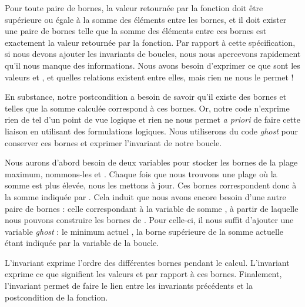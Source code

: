 


Pour toute paire de bornes, la valeur retournée par la fonction doit être
supérieure ou égale à la somme des éléments entre les bornes, et il doit exister
une paire de bornes telle que la somme des éléments entre ces bornes est
exactement la valeur retournée par la fonction. Par rapport à cette spécification,
si nous devons ajouter les invariants de boucles, nous nous apercevons rapidement
qu'il nous manque des informations. Nous avons besoin d'exprimer ce que sont
les valeurs  et , et quelles relations existent
entre elles, mais rien ne nous le permet !



En substance, notre postcondition a besoin de savoir qu'il existe des
bornes  et  telles que la somme calculée correspond à ces bornes.
Or, notre code n'exprime rien de tel d'un point de vue logique et rien ne nous
permet \textit{a priori} de faire cette liaison en utilisant des formulations logiques.
Nous utiliserons du code \textit{ghost} pour conserver ces bornes et exprimer
l'invariant de notre boucle.



Nous aurons d'abord besoin de deux variables pour stocker
les bornes de la plage maximum, nommons-les 
et . Chaque fois que nous trouvons une plage où la somme est plus
élevée, nous les mettons à jour. Ces bornes correspondent donc à la somme indiquée
par . Cela induit que nous avons encore besoin d'une autre paire de
bornes : celle correspondant à la variable de somme , à partir de laquelle
nous pouvons construire les bornes de . Pour celle-ci, il nous
suffit d'ajouter une variable \textit{ghost} : le minimum actuel , la
borne supérieure de la somme actuelle étant indiquée par la variable  de la
boucle.






L'invariant  exprime l'ordre des différentes bornes
pendant le calcul. L'invariant  exprime ce que signifient les
valeurs  et  par rapport à ces bornes. Finalement,
l'invariant  permet de faire le lien entre les invariants précédents
et la postcondition de la fonction.



